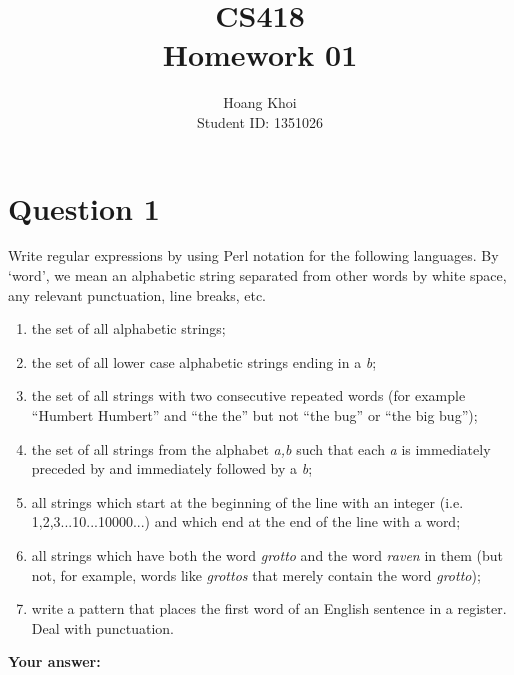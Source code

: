 \documentclass[a4paper]{article}
\begin{document}
\author{Hoang Khoi \\ Student ID: 1351026} %
\title{CS418\\Homework 01}
\maketitle


\setcounter{page}{1}
\tableofcontents
{}

\clearpage


\section{Question 1}
Write regular expressions by using Perl notation for the following languages.
By `word', we mean an alphabetic string separated from other words by white space, any relevant punctuation, line breaks, etc.
\begin{enumerate}
\item the set of all alphabetic strings;
\item the set of all lower case alphabetic strings ending in a \textit{b};
\item the set of all strings with two consecutive repeated words (for example ``Humbert Humbert'' and ``the the'' but not ``the bug'' or ``the big bug'');
\item the set of all strings from the alphabet \textit{a,b} such that each \textit{a} is immediately preceded by and immediately followed by a \textit{b};
\item all strings which start at the beginning of the line with an integer (i.e. 1,2,3...10...10000...) and which end at the end of the line with a word;
\item all strings which have both the word \textit{grotto} and the word \textit{raven} in them (but not, for example, words like \textit{grottos} that merely contain the word \textit{grotto});
\item write a pattern that places the first word of an English sentence in a register. 
Deal with punctuation.
\end{enumerate}

\textbf{Your answer:}
\end{document}
